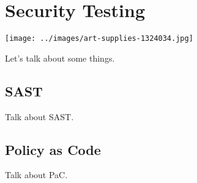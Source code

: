 \chapter{Security Testing}

\texttt{[image: ../images/art-supplies-1324034.jpg]}

Let's talk about some things. 

\section{SAST}
\justify
Talk about SAST.

\section{Policy as Code}
\justify
Talk about PaC.